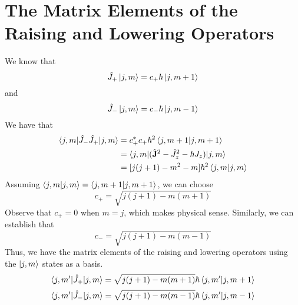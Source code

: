 \documentclass{report}
\begin{document}
\section{The Matrix Elements of the Raising and Lowering Operators}
We know that 
\[
\hat J _+ \ket{j, m} = c_+ \hbar \ket{j, m+1}
\] 
and
\[
\hat J_- \ket{j, m} = c_- \hbar \ket{j, m-1}
\] 
We have that
\begin{align*}
	\braket{j, m | \hat J_- \hat J _+ | j, m} &= c^*_+ c_+ \hbar ^2 \braket{j, m+1 | j, m+1} \\
						  &= \braket{j, m | (\hat{\mathbf J}^2 - \hat J_z^2 - \hbar J_z)| j, m}\\
						  &= [ j(j+1) - m^2 - m ] \hbar ^2 \braket{j, m | j, m}
\end{align*}
Assuming \(\braket{j, m | j, m} = \braket{j, m+1 | j, m+1}\), we can choose 
\[
c_+ = \sqrt{j(j+1) - m (m+1)}
\] 
Observe that \(c_+ = 0\) when \(m = j\), which makes physical sense. Similarly, we can establish that
\[
c_- = \sqrt{j(j+1) - m (m-1)} \] 
Thus, we have the matrix elements of the raising and lowering operators using the \(\ket{j, m}\) states as a basis.  
\[
\braket{j, m' | \hat J _+ | j, m} = \sqrt{j(j+1) - m(m+1) } \hbar \braket{j, m' | j, m+1}
\] 
\[
\braket{j, m' | \hat J _- | j, m} = \sqrt{j(j+1) - m(m-1) } \hbar \braket{j, m' | j, m-1}
\] 
\end{document}
